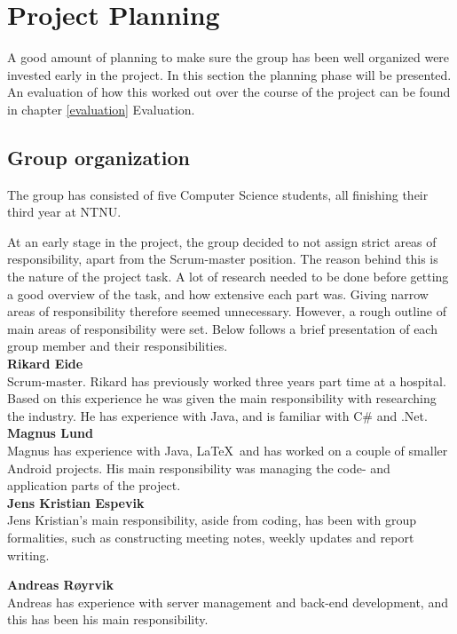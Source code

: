 \section{Project Planning}
A good amount of planning to make sure the group has been well organized were invested early in the project. In this section the planning phase will be presented. An evaluation of how this worked out over the course of the project can be found in chapter \ref{evaluation} Evaluation.

 
\subsection{Group organization}
The group has consisted of five Computer Science students, all finishing their third year at NTNU.

At an early stage in the project, the group decided to not assign strict areas of responsibility, apart from the Scrum-master position. The reason behind this is the nature of the project task. A lot of research needed to be done before getting a good overview of the task, and how extensive each part was. Giving narrow areas of responsibility therefore seemed unnecessary. However, a rough outline of main areas of responsibility were set. Below follows a brief presentation of each group member and their responsibilities.
\\

\noindent \textbf{Rikard Eide} \\
Scrum-master. Rikard has previously worked three years part time at a hospital. Based on this experience he was given the main responsibility with researching the industry. He has experience with Java, and is familiar with C\# and .Net.
\\

\noindent \textbf{Magnus Lund} \\
Magnus has experience with Java, \LaTeX\ and has worked on a couple of smaller Android projects. His main responsibility was managing the code- and application parts of the project.
\\

\noindent \textbf{Jens Kristian Espevik} \\
Jens Kristian's main responsibility, aside from coding, has been with group formalities, such as constructing meeting notes, weekly updates and report writing.
\\

\newpage

\noindent \textbf{Andreas Røyrvik} \\
Andreas has experience with server management and back-end development, and this has been his main responsibility.
\\

